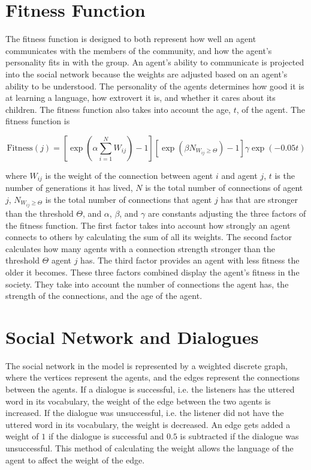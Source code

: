 \section{Fitness Function}

The fitness function is designed to both represent how well an agent communicates with the members of the community, and how the agent’s personality fits in with the group. An agent's ability to communicate is projected into the social network because the weights are adjusted based on an agent’s ability to be understood. The personality of the agents determines how good it is at learning a language, how extrovert it is, and whether it cares about its children. The fitness function also takes into account the age, $t$, of the agent. The fitness function is

\begin{equation}\label{eq:Fitness}
\text{Fitness}(j) = \left[ \exp\left(\alpha \sum_{i=1}^{N}{W_{ij}}\right)-1 \right] \left[ \exp\left(\beta N_{W_{ij} \geq \Theta}\right) -1 \right] \gamma \exp\left(-0.05 t\right)
\end{equation}

where $W_{ij}$ is the weight of the connection between agent $i$ and agent $j$, $t$ is the number of generations it has lived, $N$ is the total number of connections of agent $j$, $ N_{W_{ij} \geq \Theta}$ is the total number of connections that agent $j$ has that are stronger than the threshold $\Theta$, and $\alpha$, $\beta$, and $\gamma$ are constants adjusting the three factors of the fitness function. The first factor takes into account how strongly an agent connects to others by calculating the sum of all its weights. The second factor calculates how many agents with a connection strength stronger than the threshold $\Theta$ agent $j$ has. The third factor provides an agent with less fitness the older it becomes. These three factors combined display the agent’s fitness in the society. They take into account the number of connections the agent has, the strength of the connections, and the age of the agent.

\section{Social Network and Dialogues}

The social network in the model is represented by a weighted discrete graph, where the vertices represent the agents, and the edges represent the connections between the agents. If a dialogue is successful, i.e. the listeners has the uttered word in its vocabulary, the weight of the edge between the two agents is increased. If the dialogue was unsuccessful, i.e. the listener did not have the uttered word in its vocabulary, the weight is decreased. An edge gets added a weight of $1$ if the dialogue is successful and $0.5$ is subtracted if the dialogue was unsuccessful. This method of calculating the weight allows the language of the agent to affect the weight of the edge.

